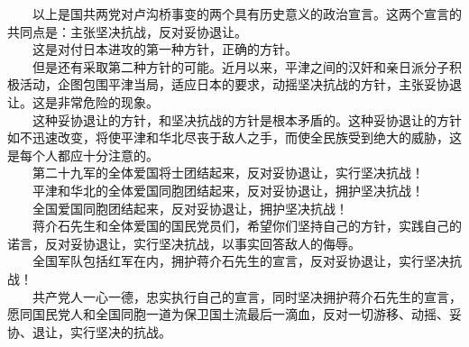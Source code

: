 \documentclass[cn,11pt,chinese]{elegantbook}
\begin{document}
　　以上是国共两党对卢沟桥事变的两个具有历史意义的政治宣言。这两个宣言的共同点是：主张坚决抗战，反对妥协退让。\\
　　这是对付日本进攻的第一种方针，正确的方针。\\
　　但是还有采取第二种方针的可能。近月以来，平津之间的汉奸和亲日派分子积极活动，企图包围平津当局，适应日本的要求，动摇坚决抗战的方针，主张妥协退让。这是非常危险的现象。\\
　　这种妥协退让的方针，和坚决抗战的方针是根本矛盾的。这种妥协退让的方针如不迅速改变，将使平津和华北尽丧于敌人之手，而使全民族受到绝大的威胁，这是每个人都应十分注意的。\\
　　第二十九军的全体爱国将士团结起来，反对妥协退让，实行坚决抗战！\\
　　平津和华北的全体爱国同胞团结起来，反对妥协退让，拥护坚决抗战！\\
　　全国爱国同胞团结起来，反对妥协退让，拥护坚决抗战！\\
　　蒋介石先生和全体爱国的国民党员们，希望你们坚持自己的方针，实践自己的诺言，反对妥协退让，实行坚决抗战，以事实回答敌人的侮辱。\\
　　全国军队包括红军在内，拥护蒋介石先生的宣言，反对妥协退让，实行坚决抗战！\\
　　共产党人一心一德，忠实执行自己的宣言，同时坚决拥护蒋介石先生的宣言，愿同国民党人和全国同胞一道为保卫国土流最后一滴血，反对一切游移、动摇、妥协、退让，实行坚决的抗战。\\
\end{document}
